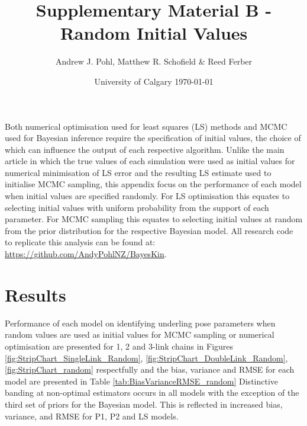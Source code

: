 \documentclass{article}
\title{Supplementary Material B - Random Initial Values} %
\author{Andrew J. Pohl, Matthew R. Schofield \&  Reed Ferber} %
\date{University of Calgary \today} %
\begin{document}
\linenumbers
\maketitle %
\doublespacing

Both numerical optimisation used for least squares (LS) methods and MCMC used for Bayesian inference require the specification of initial values, the choice of which can influence the output of each respective algorithm.  Unlike the main article in which the true values of each simulation were used as initial values for numerical minimisation of LS error and the resulting LS estimate used to initialise MCMC sampling, this appendix focus on the performance of each model when initial values are specified randomly. For LS optimisation this equates to selecting initial values with uniform probability from the support of each parameter. For MCMC sampling this equates to selecting initial values at random from the prior distribution for the respective Bayesian model.  All research code to replicate this analysis can be found at: \href{https://github.com/AndyPohlNZ/BayesKin}{https://github.com/AndyPohlNZ/BayesKin}.

\section{Results}
Performance of each model on identifying underling pose parameters when random values are used as initial values for MCMC sampling or numerical optimisation are presented for 1, 2 and 3-link chains in Figures \ref{fig:StripChart_SingleLink_Random}, \ref{fig:StripChart_DoubleLink_Random}, \ref{fig:StripChart_random} respectfully and the bias, variance and RMSE for each model are presented in Table \ref{tab:BiasVarianceRMSE_random} Distinctive banding at non-optimal estimators occurs in all models with the exception of the third set of priors for the Bayesian model.  This is reflected in increased bias, variance, and RMSE for P1, P2 and LS models.
\end{document}
